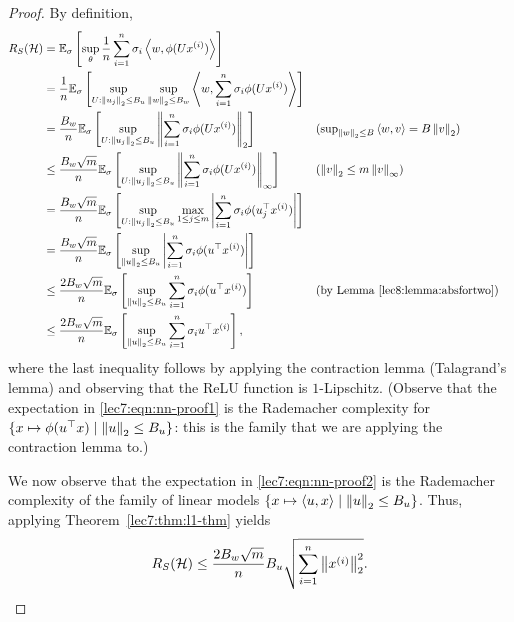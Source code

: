 \begin{proof}
    By definition,
    \begin{align}
        R_S(\mathcal{H}) 
        &= \mathbb{E}_\sigma\left[ \sup_\theta \frac{1}{n} \sum_{i=1}^n \sigma_i \left\langle w,\phi(Ux^{(i)})\right\rangle \right]
        \\&= \frac{1}{n} \mathbb{E}_\sigma\left[ \sup_{U : \left\|u_j\right\|_2 \leq B_u} \sup_{\left\|w\right\|_2 \leq B_w} \left\langle w,\sum_{i=1}^n \sigma_i \phi(Ux^{(i)})\right\rangle \right]
        \\&= \frac{B_w}{n}\mathbb{E}_\sigma\left[ \sup_{U : \left\|u_j\right\|_2 \leq B_u} \left\| \sum_{i=1}^n \sigma_i \phi(Ux^{(i)})\right\|_2 \right]
            &&\text{($\textstyle\sup_{\left\|w\right\|_2\leq B}\left\langle w,v\right\rangle = B\left\|v\right\|_2$)}
        \\&\leq \frac{B_w\sqrt{m}}{n}\mathbb{E}_\sigma\left[ \sup_{U : \left\|u_j\right\|_2 \leq B_u} \left\| \sum_{i=1}^n \sigma_i \phi(Ux^{(i)})\right\|_\infty \right]
            &&\text{($\left\|v\right\|_2 \leq m\left\|v\right\|_\infty$)}
        \\&= \frac{B_w\sqrt{m}}{n}\mathbb{E}_\sigma\left[ \sup_{U : \left\|u_j\right\|_2 \leq B_u} \max_{1\leq j\leq m} \left\lvert \sum_{i=1}^n \sigma_i \phi(u_j^\top x^{(i)})\right\rvert \right] 
        \\&= \frac{B_w\sqrt{m}}{n}\mathbb{E}_\sigma\left[ \sup_{\left\|u\right\|_2 \leq B_u} \left\lvert \sum_{i=1}^n \sigma_i \phi(u^\top x^{(i)})\right\rvert \right]
        \\&\leq \frac{2B_w\sqrt{m}}{n}\mathbb{E}_\sigma\left[ \sup_{\left\|u\right\|_2 \leq B_u} \sum_{i=1}^n \sigma_i \phi(u^\top x^{(i)}) \right]
            &&\text{(by Lemma \ref{lec8:lemma:absfortwo})} \label{lec7:eqn:nn-proof1}
        \\&\leq \frac{2B_w\sqrt{m}}{n}\mathbb{E}_\sigma\left[ \sup_{\left\|u\right\|_2 \leq B_u} \sum_{i=1}^n \sigma_i u^\top x^{(i)} \right], \label{lec7:eqn:nn-proof2}
    \end{align}
    where the last inequality follows by applying the contraction lemma (Talagrand's lemma) and observing that the ReLU function is $1$-Lipschitz. (Observe that the expectation in \eqref{lec7:eqn:nn-proof1} is the Rademacher complexity for $\{ x \mapsto \phi(u^\top x) \mid \left\|u\right\|_2 \leq B_u \}$: this is the family that we are applying the contraction lemma to.)
    
    We now observe that the expectation in \eqref{lec7:eqn:nn-proof2} is the Rademacher complexity of the family of linear models $\{x \mapsto \left\langle u,x\right\rangle \mid \left\|u\right\|_2\leq B_u\}$. Thus, applying Theorem~\ref{lec7:thm:l1-thm} yields
    \begin{equation}
        R_S(\mathcal{H}) \leq \frac{2B_w\sqrt{m}}{n}B_u\sqrt{\sum_{i=1}^n \left\|x^{(i)}\right\|_2^2}.
    \end{equation}
    

\end{proof}
